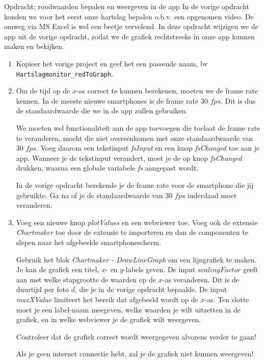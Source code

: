 \begin{opdracht}{Opdracht: roodwaarden bepalen en weergeven in de app}
	In de vorige opdracht konden we voor het eerst onze hartslag bepalen o.b.v. een opgenomen video. De omweg via MS Excel is wel een beetje vervelend. In deze opdracht wijzigen we de app uit de vorige opdracht, zodat we de grafiek rechtstreeks in onze app kunnen maken en bekijken.
	
	\begin{enumerate}
		\item Kopieer het vorige project en geef het een passende naam, bv \texttt{Hartslagmonitor\_redToGraph}. 
		\item Om de tijd op de $x$-as correct te kunnen berekenen, moeten we de frame rate kennen. In de meeste nieuwe smartphones is de frame rate 30 $fps$. Dit is dus de standaardwaarde die we in de app zullen gebruiken.
		
		We moeten wel functionaliteit aan de app toevoegen die toelaat de frame rate te veranderen, mocht die niet overeenkomen met onze standaardwaarde van 30 $fps$. Voeg daarom een tekstinput \emph{fsInput} en een knop \emph{fsChanged} toe aan je app. Wanneer je de tekstinput verandert, moet je de op knop \emph{fsChanged} drukken, waarna een globale variabele \emph{fs} aangepast wordt.
		
		In de vorige opdracht berekende je de frame rate voor de smartphone die jij gebruikte. Ga na of je de standaardwaarde van 30 $fps$ inderdaad moet veranderen.
		
		\item Voeg een nieuwe knop \emph{plotValues} en een webviewer toe. Voeg ook de extensie \emph{Chartmaker} toe door de extensie te importeren en dan de componenten te slepen naar het afgebeelde smartphonescherm.
		
		Gebruik het blok \emph{Chartmaker - DrawLineGraph} om een lijngrafiek te maken. Je kan de grafiek een titel, $x$- en $y$-labels geven. De input $scalingFactor$ geeft aan met welke stapgrootte de waarden op de $x$-as veranderen. Dit is de duurtijd per foto $d$, die je in de vorige opdracht bepaalde. De input \emph{maxXValue} limiteert het bereik dat afgebeeld wordt op de $x$-as. Ten slotte moet je een label-naam meegeven, welke waarden je wilt uitzetten in de grafiek, en in welke webviewer je de grafiek wilt weergeven.
		
		Controleer dat de grafiek correct wordt weergegeven alvorens verder te gaan!
		
		\begin{opmerking}
			Als je geen internet connectie hebt, zal je de grafiek niet kunnen weergeven! 
		\end{opmerking}
	\end{enumerate}
\end{opdracht}
	


